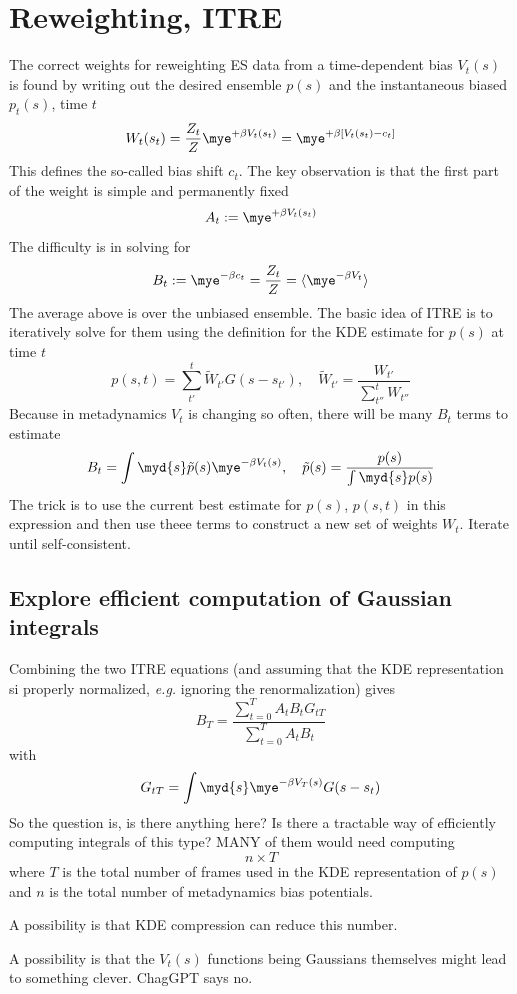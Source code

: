 \section{Reweighting, ITRE}
The correct weights for reweighting ES data from a time-dependent bias $V_t(s)$ is found by writing out the desired ensemble $p(s)$ and the instantaneous biased $p_t(s)$, time $t$
\[
    W_t(s_t) = \frac{Z_t}{Z}\mye^{+\beta V_t(s_t)}
    = \mye^{+\beta[V_t(s_t)-c_t]}
\]
This defines the so-called bias shift $c_t$.  The key observation is that the first part of the weight is simple and permanently fixed
\[
    A_t := \mye^{+\beta V_t(s_t)}
\]
The difficulty is in solving for
\[
    B_t := \mye^{-\beta c_t} = \frac{Z_t}{Z} = \langle \mye^{-\beta V_t} \rangle
\]
The average above is over the unbiased ensemble.  The basic idea of ITRE is to iteratively solve for them using the definition for the KDE estimate for $p(s)$ at time $t$
\[
p(s,t) = \sum_{t'}^t \widetilde{W}_{t'} G(s-s_{t'}),\quad
\widetilde{W}_{t'} = \frac{W_{t'}}{\sum_{t''}^{t}W_{t''}}
\]
Because in metadynamics $V_t$ is changing so often, there will be many $B_t$ terms to estimate
\[
    B_t = \int\myd{s}\tilde{p}(s)\mye^{-\beta V_t(s)},\quad
    \tilde{p}(s) = \frac{p(s)}{\int\myd{s}p(s)}
\]
The trick is to use the current best estimate for $p(s)$, $p(s,t)$ in this expression and then use theee terms to construct a new set of weights $W_t$.  Iterate until self-consistent.

\subsection{Explore efficient computation of Gaussian integrals}
Combining the two ITRE equations (and assuming that the KDE representation si properly normalized, \emph{e.g.} ignoring the renormalization) gives
\[
    B_T = \frac{\sum_{t=0}^T A_tB_t G_{tT}}{\sum_{t=0}^T A_tB_t}
\]
with
\[
    G_{tT} = \int\myd{s}\mye^{-\beta V_T(s)}G(s-s_t)
\]
So the question is, is there anything here?  Is there a tractable way of efficiently computing integrals of this type?  MANY of them would need computing
\[
    n\times T
\]
where $T$ is the total number of frames used in the KDE representation of $p(s)$ and $n$ is the total number of metadynamics bias potentials.

A possibility is that KDE compression can reduce this number.

A possibility is that the $V_t(s)$ functions being Gaussians themselves might lead to something clever.  ChagGPT says no.

